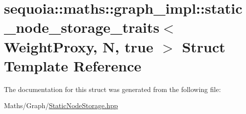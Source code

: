 \hypertarget{structsequoia_1_1maths_1_1graph__impl_1_1static__node__storage__traits_3_01_weight_proxy_00_01_n_00_01true_01_4}{}\section{sequoia\+::maths\+::graph\+\_\+impl\+::static\+\_\+node\+\_\+storage\+\_\+traits$<$ Weight\+Proxy, N, true $>$ Struct Template Reference}
\label{structsequoia_1_1maths_1_1graph__impl_1_1static__node__storage__traits_3_01_weight_proxy_00_01_n_00_01true_01_4}


The documentation for this struct was generated from the following file\+:\begin{DoxyCompactItemize}
\item 
Maths/\+Graph/\mbox{\hyperlink{_static_node_storage_8hpp}{Static\+Node\+Storage.\+hpp}}\end{DoxyCompactItemize}
